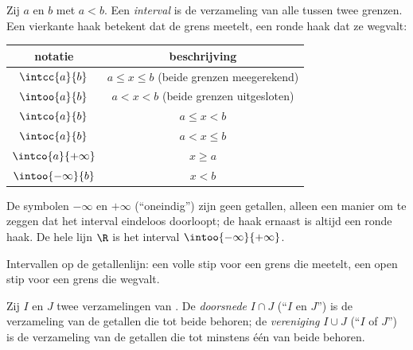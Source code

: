 \begin{definition}[Interval]\label{def:g10:numbers:interval}
Zij $a$ en $b$  met $a < b$. Een
\emph{interval} is de verzameling van alle 
tussen twee grenzen. Een vierkante haak betekent dat de grens meetelt, een
ronde haak dat ze wegvalt:
\begin{center}
\begin{tabular}{c|c}
notatie & beschrijving \\
\hline
$\intcc{a}{b}$ & $a \leq x \leq b$ (beide grenzen meegerekend) \\
$\intoo{a}{b}$ & $a < x < b$ (beide grenzen uitgesloten) \\
$\intco{a}{b}$ & $a \leq x < b$ \\
$\intoc{a}{b}$ & $a < x \leq b$ \\
$\intco{a}{+\infty}$ & $x \geq a$ \\
$\intoo{-\infty}{b}$ & $x < b$ \\
\end{tabular}
\end{center}
De symbolen $-\infty$ en $+\infty$ (``oneindig'') zijn geen getallen, alleen
een manier om te zeggen dat het interval eindeloos doorloopt; de haak ernaast
is altijd een ronde haak. De hele lijn $\R$ is het interval
$\intoo{-\infty}{+\infty}$.
\end{definition}

\begin{omfigure}

{\small Intervallen op de getallenlijn: een volle stip voor een grens die
meetelt, een open stip voor een grens die wegvalt.}
\end{omfigure}

\begin{definition}\label{def:g10:numbers:interunion}
Zij $I$ en $J$ twee verzamelingen van . De
\emph{doorsnede} $I \cap J$ (``$I$ en $J$'') is de
verzameling van de getallen die tot beide behoren; de
\emph{vereniging} $I \cup J$ (``$I$ of $J$'') is de
verzameling van de getallen die tot minstens één van beide behoren.
\end{definition}

